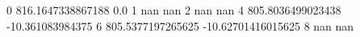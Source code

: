 0 816.1647338867188 0.0
1 nan nan
2 nan nan
4 805.8036499023438 -10.361083984375
6 805.5377197265625 -10.62701416015625
8 nan nan
